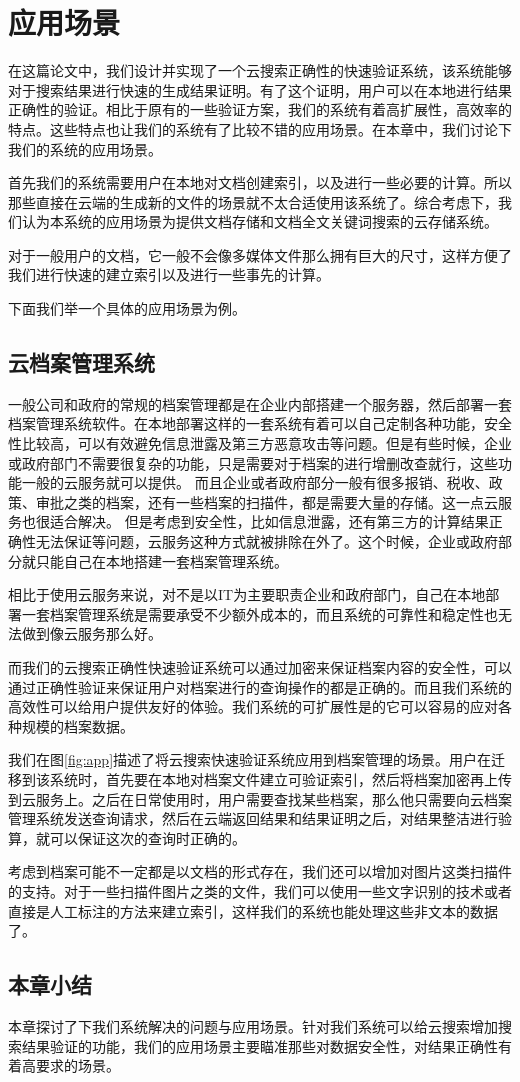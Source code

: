 \chapter{应用场景}
\label{chap:application}
在这篇论文中，我们设计并实现了一个云搜索正确性的快速验证系统，该系统能够对于搜索结果进行快速的生成结果证明。有了这个证明，用户可以在本地进行结果正确性的验证。相比于原有的一些验证方案，我们的系统有着高扩展性，高效率的特点。这些特点也让我们的系统有了比较不错的应用场景。在本章中，我们讨论下我们的系统的应用场景。

首先我们的系统需要用户在本地对文档创建索引，以及进行一些必要的计算。所以那些直接在云端的生成新的文件的场景就不太合适使用该系统了。综合考虑下，我们认为本系统的应用场景为提供文档存储和文档全文关键词搜索的云存储系统。

对于一般用户的文档，它一般不会像多媒体文件那么拥有巨大的尺寸，这样方便了我们进行快速的建立索引以及进行一些事先的计算。

下面我们举一个具体的应用场景为例。

\section{云档案管理系统}
一般公司和政府的常规的档案管理都是在企业内部搭建一个服务器，然后部署一套档案管理系统软件\cite{DocumentManage}。在本地部署这样的一套系统有着可以自己定制各种功能，安全性比较高，可以有效避免信息泄露及第三方恶意攻击等问题。但是有些时候，企业或政府部门不需要很复杂的功能，只是需要对于档案的进行增删改查就行，这些功能一般的云服务就可以提供。
而且企业或者政府部分一般有很多报销、税收、政策、审批之类的档案，还有一些档案的扫描件，都是需要大量的存储。这一点云服务也很适合解决。
但是考虑到安全性，比如信息泄露，还有第三方的计算结果正确性无法保证等问题，云服务这种方式就被排除在外了。这个时候，企业或政府部分就只能自己在本地搭建一套档案管理系统。

相比于使用云服务来说，对不是以IT为主要职责企业和政府部门，自己在本地部署一套档案管理系统是需要承受不少额外成本的，而且系统的可靠性和稳定性也无法做到像云服务那么好。


而我们的云搜索正确性快速验证系统可以通过加密来保证档案内容的安全性，可以通过正确性验证来保证用户对档案进行的查询操作的都是正确的。而且我们系统的高效性可以给用户提供友好的体验。我们系统的可扩展性是的它可以容易的应对各种规模的档案数据。

我们在图\ref{fig:app}描述了将云搜索快速验证系统应用到档案管理的场景。用户在迁移到该系统时，首先要在本地对档案文件建立可验证索引，然后将档案加密再上传到云服务上。之后在日常使用时，用户需要查找某些档案，那么他只需要向云档案管理系统发送查询请求，然后在云端返回结果和结果证明之后，对结果整洁进行验算，就可以保证这次的查询时正确的。

考虑到档案可能不一定都是以文档的形式存在，我们还可以增加对图片这类扫描件的支持。对于一些扫描件图片之类的文件，我们可以使用一些文字识别的技术或者直接是人工标注的方法来建立索引，这样我们的系统也能处理这些非文本的数据了。

\section{本章小结}
本章探讨了下我们系统解决的问题与应用场景。针对我们系统可以给云搜索增加搜索结果验证的功能，我们的应用场景主要瞄准那些对数据安全性，对结果正确性有着高要求的场景。
